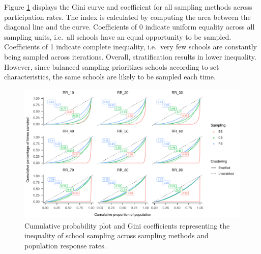 \documentclass[
  english,
  man,floatsintext]{apa6}
\begin{document}
Figure \ref{fig:fig-gini-curve} displays the Gini curve and coefficient for all sampling methods across participation rates. The index is calculated by computing the area between the diagonal line and the curve. Coefficients of 0 indicate uniform equality across all sampling units, i.e.~all schools have an equal opportunity to be sampled. Coefficients of 1 indicate complete inequality, i.e.~very few schools are constantly being sampled across iterations. Overall, stratification results in lower inequality. However, since balanced sampling prioritizes schools according to set characteristics, the same schools are likely to be sampled each time.



\begin{figure}
\includegraphics{6---Paper_files/figure-latex/fig-gini-curve-1} \caption{Cumulative probability plot and Gini coefficients representing the inequality of school sampling across sampling methods and population response rates.}\label{fig:fig-gini-curve}
\end{figure}
\end{document}
